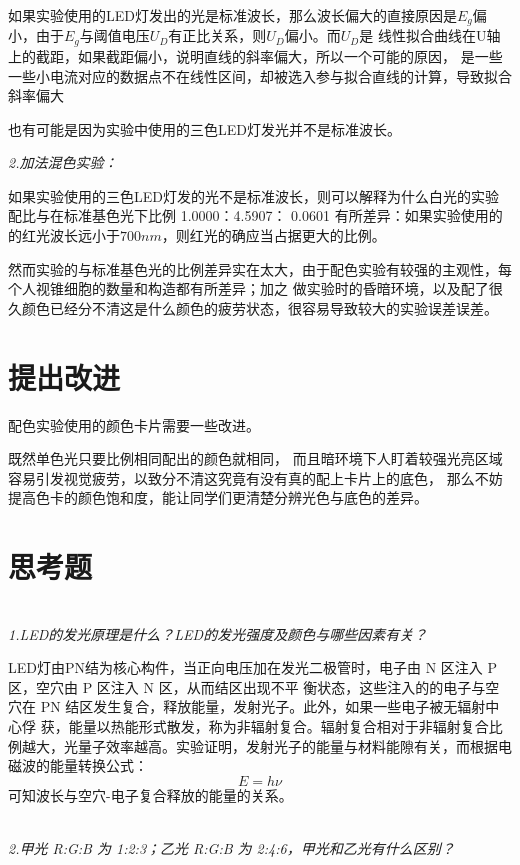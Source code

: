 \documentclass[UTF8]{ctexart}
\begin{document}
    如果实验使用的LED灯发出的光是标准波长，那么波长偏大的直接原因是$E_g$偏小，由于$E_g$与阈值电压$U_D$有正比关系，则$U_D$偏小。而$U_D$是
    线性拟合曲线在U轴上的截距，如果截距偏小，说明直线的斜率偏大，所以一个可能的原因，
    是一些一些小电流对应的数据点不在线性区间，却被选入参与拟合直线的计算，导致拟合斜率偏大

    也有可能是因为实验中使用的三色LED灯发光并不是标准波长。

    \emph{2.加法混色实验：}

    如果实验使用的三色LED灯发的光不是标准波长，则可以解释为什么白光的实验配比与在标准基色光下比例 1.0000：4.5907：
    0.0601 有所差异：如果实验使用的的红光波长远小于$700nm$，则红光的确应当占据更大的比例。
    
    然而实验的与标准基色光的比例差异实在太大，由于配色实验有较强的主观性，每个人视锥细胞的数量和构造都有所差异；加之
    做实验时的昏暗环境，以及配了很久颜色已经分不清这是什么颜色的疲劳状态，很容易导致较大的实验误差误差。


    \section{提出改进}
    配色实验使用的颜色卡片需要一些改进。
    
    既然单色光只要比例相同配出的颜色就相同，
    而且暗环境下人盯着较强光亮区域容易引发视觉疲劳，以致分不清这究竟有没有真的配上卡片上的底色，
    那么不妨提高色卡的颜色饱和度，能让同学们更清楚分辨光色与底色的差异。


    \section{思考题}
    
    \emph{\\[0.02cm]1.LED的发光原理是什么？LED的发光强度及颜色与哪些因素有关？}

    LED灯由PN结为核心构件，当正向电压加在发光二极管时，电子由 N 区注入 P 区，空穴由 P 区注入 N 区，从而结区出现不平
衡状态，这些注入的的电子与空穴在 PN 结区发生复合，释放能量，发射光子。此外，如果一些电子被无辐射中心俘
获，能量以热能形式散发，称为非辐射复合。辐射复合相对于非辐射复合比例越大，光量子效率越高。实验证明，发射光子的能量与材料能隙有关，而根据电磁波的能量转换公式：
\begin{equation}
    E=h\nu 
\end{equation}
可知波长与空穴-电子复合释放的能量的关系。

    \emph{\\[0.02cm]2.甲光 R:G:B 为 1:2:3；乙光 R:G:B 为 2:4:6，甲光和乙光有什么区别？}
\end{document}
